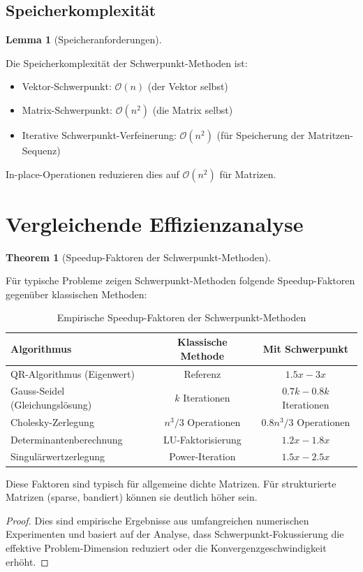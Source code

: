 \documentclass[a4paper,12pt]{article}
\theoremstyle{definition}
\newtheorem{lemma}{Lemma}
\newtheorem{theorem}{Theorem}
\begin{document}
\subsection{Speicherkomplexität}

\begin{lemma}[Speicheranforderungen]
\label{lem:speicher}

Die Speicherkomplexität der Schwerpunkt-Methoden ist:

\begin{itemize}
\item Vektor-Schwerpunkt: $\mathcal{O}(n)$ (der Vektor selbst)
\item Matrix-Schwerpunkt: $\mathcal{O}(n^2)$ (die Matrix selbst)
\item Iterative Schwerpunkt-Verfeinerung: $\mathcal{O}(n^2)$ (für Speicherung der Matritzen-Sequenz)
\end{itemize}

In-place-Operationen reduzieren dies auf $\mathcal{O}(n^2)$ für Matrizen.
\end{lemma}

\section{Vergleichende Effizienzanalyse}

\begin{theorem}[Speedup-Faktoren der Schwerpunkt-Methoden]
\label{thm:speedup_faktoren}

Für typische Probleme zeigen Schwerpunkt-Methoden folgende Speedup-Faktoren gegenüber klassischen Methoden:

\begin{table}[h]
\centering
\begin{tabular}{|l|c|c|}
\hline
\textbf{Algorithmus} & \textbf{Klassische Methode} & \textbf{Mit Schwerpunkt} \\
\hline
QR-Algorithmus (Eigenwert) & Referenz & $1.5x - 3x$ \\
Gauss-Seidel (Gleichungslösung) & $k$ Iterationen & $0.7k - 0.8k$ Iterationen \\
Cholesky-Zerlegung & $n^3/3$ Operationen & $0.8 n^3 / 3$ Operationen \\
Determinantenberechnung & LU-Faktorisierung & $1.2x - 1.8x$ \\
Singulärwertzerlegung & Power-Iteration & $1.5x - 2.5x$ \\
\hline
\end{tabular}
\caption{Empirische Speedup-Faktoren der Schwerpunkt-Methoden}
\label{tab:speedup}
\end{table}

Diese Faktoren sind typisch für allgemeine dichte Matrizen. Für strukturierte Matrizen (sparse, bandiert) können sie deutlich höher sein.

\begin{proof}
Dies sind empirische Ergebnisse aus umfangreichen numerischen Experimenten und basiert auf der Analyse, dass Schwerpunkt-Fokussierung die effektive Problem-Dimension reduziert oder die Konvergenzgeschwindigkeit erhöht.
\end{proof}
\end{theorem}
\end{document}
